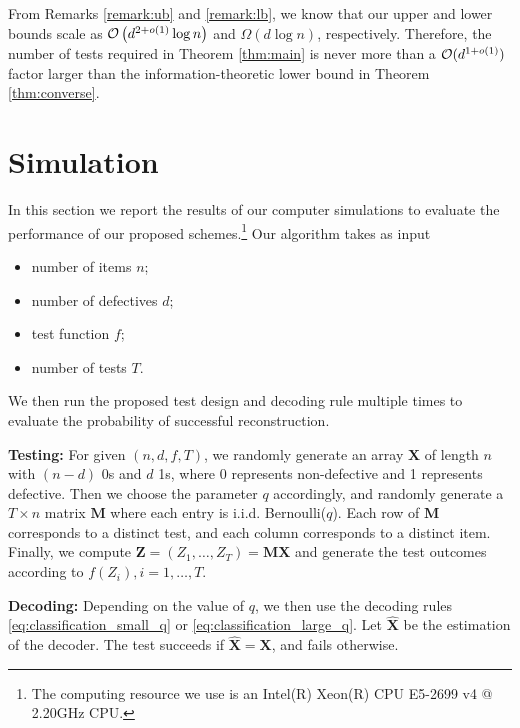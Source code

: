 \documentclass[onecolumn,letterpaper]{IEEEtran}
\newcommand{\cp}{{q}}
\newcommand{\ary}{\boldsymbol{X}}
\newcommand{\simdoc}{\boldsymbol{\hat{X}}}
\newcommand{\mtx}{\boldsymbol{M}}
\newcommand{\rs}{\boldsymbol{Z}}
\newcommand{\rse}{Z}
\begin{document}
From Remarks \ref{remark:ub} and \ref{remark:lb}, we know that our upper and lower bounds scale as ${\cal O}\left(d^{2+o(1)}\log n\right)$ and $\Omega\left(d\log n\right)$, respectively. Therefore, the number of tests required in Theorem \ref{thm:main} is never more than a ${\cal O}(d^{1+o(1)})$ factor larger than the information-theoretic lower bound in Theorem \ref{thm:converse}.



\section{Simulation}
\label{sec:simulation}
In this section we report the results of our computer simulations to evaluate the performance of our proposed schemes.\footnote{The computing resource we use is an Intel(R) Xeon(R) CPU E5-2699 v4 @ 2.20GHz CPU.}
Our algorithm takes as input
\begin{itemize}
    \item number of items $n$;
    \item number of defectives $d$;
    \item test function $f$;
    \item number of tests $T$.
\end{itemize}
We then run the proposed test design and decoding rule multiple times to evaluate the probability of successful reconstruction.

\textbf{Testing:}
For given $(n,d,f,T)$, we randomly generate an array $\ary$ of length $n$ with $(n-d)$ 0s and $d$ 1s, where 0 represents non-defective and 1 represents defective. Then we choose the parameter $\cp$ accordingly, and randomly generate a $T\times n$ matrix $\mtx$ where each entry is i.i.d. Bernoulli($\cp$). Each row of $\mtx$ corresponds to a distinct test, and each column corresponds to a distinct item. Finally, we compute $\rs =(\rse_1,\dots,\rse_T)=  \mtx  \ary $ and generate the test outcomes according to $f(\rse_i), i=1,\dots, T$.

\textbf{Decoding:}
Depending on the value of $\cp$, we then use the decoding rules \eqref{eq:classification_small_q} or \eqref{eq:classification_large_q}. Let $\simdoc$ be the estimation of the decoder. The test succeeds if $\simdoc = \ary$, and fails otherwise.
\end{document}
